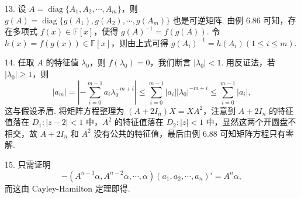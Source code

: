 \documentclass[UTF8, 12pt, fontset=fandol, oneside]{ctexart}
\begin{document}
13. 设 $A=\operatorname{diag}\{A_1,A_2,\cdots,A_m\}$，则 $g(A)=\operatorname{diag}\{g(A_1),g(A_2),\cdots,g(A_m)\}$ 也是可逆矩阵. 由例 6.86 可知，存在多项式 $f(x)\in\mathbb{F}[x]$，使得 $g(A)^{-1}=f(g(A))$. 令 $h(x)=f(g(x))\in\mathbb{F}[x]$，则由上式可得 $g(A_i)^{-1}=h(A_i)(1\le i\le m)$.

14. 任取 $A$ 的特征值 $\lambda_0$，则 $f(\lambda_0)=0$，我们断言 $|\lambda_0|<1$. 用反证法，若 $|\lambda_0|\ge 1$，则
\[
|a_m|=\left|-\sum_{i=0}^{m-1}a_i\lambda_0^{-m+i}\right|\le \sum_{i=0}^{m-1}|a_i||\lambda_0|^{-m+i}\le\sum_{i=0}^{m-1}|a_i|,
\]
这与假设矛盾. 将矩阵方程整理为 $(A+2I_n)X=XA^2$，注意到 $A+2I_n$ 的特征值落在 $D_1:|z-2|<1$ 中，$A^2$ 的特征值落在 $D_2:|z|<1$ 中，显然这两个开圆盘不相交，故 $A+2I_n$ 和 $A^2$ 没有公共的特征值，最后由例 6.88 可知矩阵方程只有零解.

15. 只需证明
\[
-(A^{n-1}\alpha,A^{n-2}\alpha,\cdots,\alpha)(a_1,a_2,\cdots,a_n)'=A^n\alpha,
\]
而这由 Cayley-Hamilton 定理即得.
\end{document}
